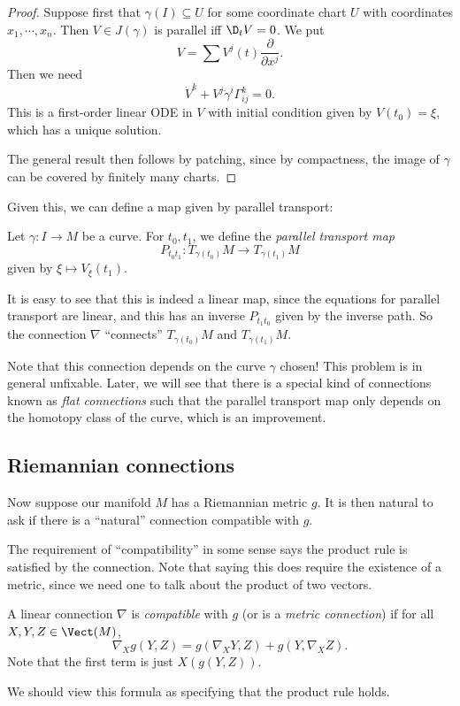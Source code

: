 \documentclass[a4paper]{article}
\begin{document}
\begin{proof}
  Suppose first that $\gamma(I) \subseteq U$ for some coordinate chart $U$ with coordinates $x_1, \cdots, x_n$. Then $V\in J(\gamma)$ is parallel iff $\D_t V = 0$. We put
  \[
    V = \sum V^j(t) \frac{\partial}{\partial x^j}.
  \]
  Then we need
  \[
    \dot{V}^k + V^j \dot\gamma^i \Gamma_{ij}^k = 0.
  \]
  This is a first-order linear ODE in $V$ with initial condition given by $V(t_0) = \xi$, which has a unique solution.

  The general result then follows by patching, since by compactness, the image of $\gamma$ can be covered by finitely many charts.
\end{proof}

Given this, we can define a map given by parallel transport:
\begin{defi}
  Let $\gamma: I \to M$ be a curve. For $t_0, t_1$, we define the \emph{parallel transport map}
  \[
    P_{t_0 t_1}: T_{\gamma(t_0)}M \to T_{\gamma(t_1)}M
  \]
  given by $\xi \mapsto V_{\xi}(t_1)$.
\end{defi}

It is easy to see that this is indeed a linear map, since the equations for parallel transport are linear, and this has an inverse $P_{t_1t_0}$ given by the inverse path. So the connection $\nabla$ ``connects'' $T_{\gamma(t_0)}M$ and $T_{\gamma(t_1)}M$.

Note that this connection depends on the curve $\gamma$ chosen! This problem is in general unfixable. Later, we will see that there is a special kind of connections known as \emph{flat connections} such that the parallel transport map only depends on the homotopy class of the curve, which is an improvement.

\subsection{Riemannian connections}
Now suppose our manifold $M$ has a Riemannian metric $g$. It is then natural to ask if there is a ``natural'' connection compatible with $g$.

The requirement of ``compatibility'' in some sense says the product rule is satisfied by the connection. Note that saying this does require the existence of a metric, since we need one to talk about the product of two vectors.

\begin{defi}
  A linear connection $\nabla$ is \emph{compatible} with $g$ (or is a \emph{metric connection}) if for all $X, Y, Z \in \Vect(M)$,
  \[
    \nabla_X g(Y, Z) = g(\nabla_X Y, Z) + g(Y, \nabla_X Z).
  \]
  Note that the first term is just $X(g(Y, Z))$.
\end{defi}
We should view this formula as specifying that the product rule holds.
\end{document}
